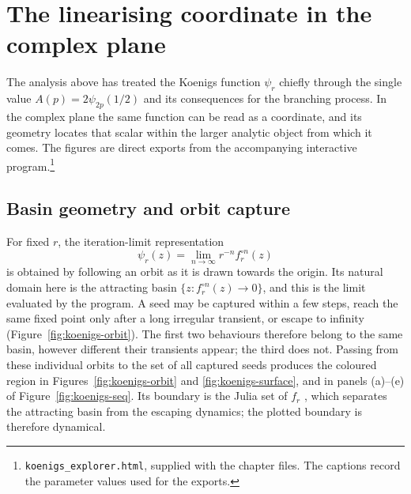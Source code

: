 
\section{The linearising coordinate in the complex plane}
\label{sec:koenigsvisual}

The analysis above has treated the Koenigs function $\psi_r$ chiefly through
the single value $A(p)=2\psi_{2p}(1/2)$ and its consequences for the branching
process. In the complex plane the same function can be read as a coordinate,
and its geometry locates that scalar within the larger analytic object from
which it comes. The figures are direct exports from the accompanying interactive
program.\footnote{\texttt{koenigs\_explorer.html}, supplied with the chapter
files. The captions record the parameter values used for the exports.}

\subsection{Basin geometry and orbit capture}

For fixed $r$, the iteration-limit representation
\[
\psi_r(z)=\lim_{n\to\infty}r^{-n}f_r^{\circ n}(z)
\]
is obtained by following an orbit as it is drawn towards the origin. Its natural
domain here is the attracting basin $\{z:f_r^{\circ n}(z)\to0\}$, and this is
the limit evaluated by the program. A seed may be captured within a few steps, reach the
same fixed point only after a long irregular transient, or escape to infinity
(Figure~\ref{fig:koenigs-orbit}). The first two behaviours therefore belong to
the same basin, however different their transients appear; the third does not.
Passing from these individual orbits to the set of all captured seeds produces
the coloured region in Figures~\ref{fig:koenigs-orbit} and
\ref{fig:koenigs-surface}, and in panels (a)--(e) of
Figure~\ref{fig:koenigs-seq}. Its boundary is the Julia set of $f_r$
\cite{Milnor2006}, which separates the attracting basin from the escaping
dynamics; the plotted boundary is therefore dynamical.

